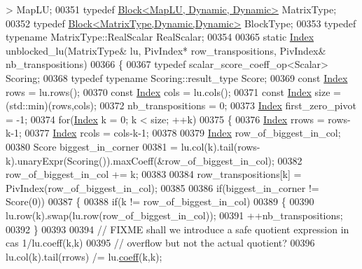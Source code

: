 \begin{DoxyCode}
       > MapLU;
00351   \textcolor{keyword}{typedef} \hyperlink{group___core___module_class_eigen_1_1_block}{Block<MapLU, Dynamic, Dynamic>} MatrixType;
00352   \textcolor{keyword}{typedef} \hyperlink{group___core___module_class_eigen_1_1_block}{Block<MatrixType,Dynamic,Dynamic>} BlockType;
00353   \textcolor{keyword}{typedef} \textcolor{keyword}{typename} MatrixType::RealScalar RealScalar;
00354 
00365   \textcolor{keyword}{static} \hyperlink{group___core___module_a554f30542cc2316add4b1ea0a492ff02}{Index} unblocked\_lu(MatrixType& lu, PivIndex* row\_transpositions, PivIndex& nb\_transpositions)
00366   \{
00367     \textcolor{keyword}{typedef} scalar\_score\_coeff\_op<Scalar> Scoring;
00368     \textcolor{keyword}{typedef} \textcolor{keyword}{typename} Scoring::result\_type Score;
00369     \textcolor{keyword}{const} \hyperlink{group___core___module_a554f30542cc2316add4b1ea0a492ff02}{Index} rows = lu.rows();
00370     \textcolor{keyword}{const} \hyperlink{group___core___module_a554f30542cc2316add4b1ea0a492ff02}{Index} cols = lu.cols();
00371     \textcolor{keyword}{const} \hyperlink{group___core___module_a554f30542cc2316add4b1ea0a492ff02}{Index} size = (std::min)(rows,cols);
00372     nb\_transpositions = 0;
00373     \hyperlink{group___core___module_a554f30542cc2316add4b1ea0a492ff02}{Index} first\_zero\_pivot = -1;
00374     \textcolor{keywordflow}{for}(\hyperlink{group___core___module_a554f30542cc2316add4b1ea0a492ff02}{Index} k = 0; k < size; ++k)
00375     \{
00376       \hyperlink{group___core___module_a554f30542cc2316add4b1ea0a492ff02}{Index} rrows = rows-k-1;
00377       \hyperlink{group___core___module_a554f30542cc2316add4b1ea0a492ff02}{Index} rcols = cols-k-1;
00378 
00379       \hyperlink{group___core___module_a554f30542cc2316add4b1ea0a492ff02}{Index} row\_of\_biggest\_in\_col;
00380       Score biggest\_in\_corner
00381         = lu.col(k).tail(rows-k).unaryExpr(Scoring()).maxCoeff(&row\_of\_biggest\_in\_col);
00382       row\_of\_biggest\_in\_col += k;
00383 
00384       row\_transpositions[k] = PivIndex(row\_of\_biggest\_in\_col);
00385 
00386       \textcolor{keywordflow}{if}(biggest\_in\_corner != Score(0))
00387       \{
00388         \textcolor{keywordflow}{if}(k != row\_of\_biggest\_in\_col)
00389         \{
00390           lu.row(k).swap(lu.row(row\_of\_biggest\_in\_col));
00391           ++nb\_transpositions;
00392         \}
00393 
00394         \textcolor{comment}{// FIXME shall we introduce a safe quotient expression in cas 1/lu.coeff(k,k)}
00395         \textcolor{comment}{// overflow but not the actual quotient?}
00396         lu.col(k).tail(rrows) /= lu.\hyperlink{class_eigen_1_1_plain_object_base_afbfc12954f16d21aedb7bd839f64a278}{coeff}(k,k);

\end{DoxyCode}
